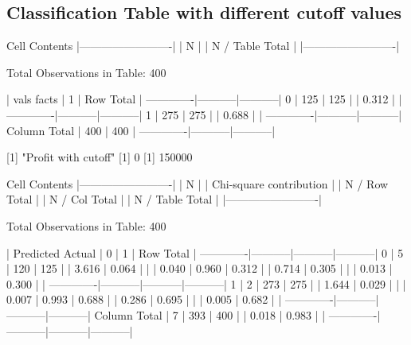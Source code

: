 \documentclass{article}
\begin{document}
\subsection{Classification Table with different cutoff values}
\begin{Schunk}
\begin{Soutput}
   Cell Contents
|-------------------------|
|                       N |
|         N / Table Total |
|-------------------------|

 
Total Observations in Table:  400 

 
             | vals 
       facts |         1 | Row Total | 
-------------|-----------|-----------|
           0 |       125 |       125 | 
             |     0.312 |           | 
-------------|-----------|-----------|
           1 |       275 |       275 | 
             |     0.688 |           | 
-------------|-----------|-----------|
Column Total |       400 |       400 | 
-------------|-----------|-----------|

 
[1] "Profit with cutoff"
[1] 0
[1] 150000

 
   Cell Contents
|-------------------------|
|                       N |
| Chi-square contribution |
|           N / Row Total |
|           N / Col Total |
|         N / Table Total |
|-------------------------|

 
Total Observations in Table:  400 

 
             | Predicted 
      Actual |         0 |         1 | Row Total | 
-------------|-----------|-----------|-----------|
           0 |         5 |       120 |       125 | 
             |     3.616 |     0.064 |           | 
             |     0.040 |     0.960 |     0.312 | 
             |     0.714 |     0.305 |           | 
             |     0.013 |     0.300 |           | 
-------------|-----------|-----------|-----------|
           1 |         2 |       273 |       275 | 
             |     1.644 |     0.029 |           | 
             |     0.007 |     0.993 |     0.688 | 
             |     0.286 |     0.695 |           | 
             |     0.005 |     0.682 |           | 
-------------|-----------|-----------|-----------|
Column Total |         7 |       393 |       400 | 
             |     0.018 |     0.983 |           | 
-------------|-----------|-----------|-----------|


\end{Soutput}
\end{Schunk}
\end{document}
